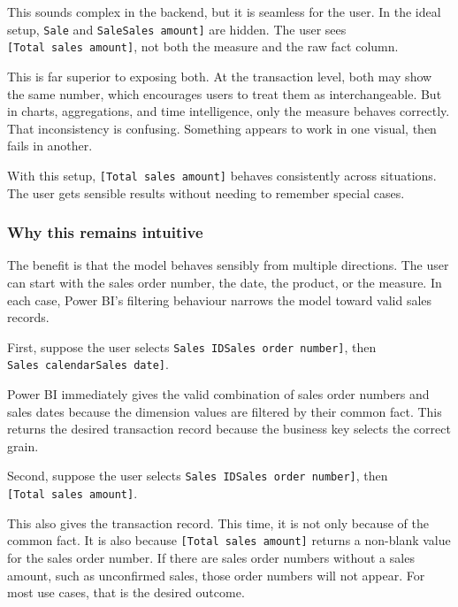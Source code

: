 \documentclass[10pt,openany,10pt]{book}
\begin{document}
This sounds complex in the backend, but it is seamless for the user. In
the ideal setup, \texttt{\textquotesingle{}Sale\textquotesingle{}} and
\texttt{\textquotesingle{}Sale\textquotesingle{}{[}Sales\ amount{]}} are
hidden. The user sees \texttt{{[}Total\ sales\ amount{]}}, not both the
measure and the raw fact column.

This is far superior to exposing both. At the transaction level, both
may show the same number, which encourages users to treat them as
interchangeable. But in charts, aggregations, and time intelligence,
only the measure behaves correctly. That inconsistency is confusing.
Something appears to work in one visual, then fails in another.

With this setup, \texttt{{[}Total\ sales\ amount{]}} behaves
consistently across situations. The user gets sensible results without
needing to remember special cases.

\subsubsection{Why this remains
intuitive}\label{why-this-remains-intuitive}

The benefit is that the model behaves sensibly from multiple directions.
The user can start with the sales order number, the date, the product,
or the measure. In each case, Power BI's filtering behaviour narrows the
model toward valid sales records.

First, suppose the user selects
\texttt{\textquotesingle{}Sales\ ID\textquotesingle{}{[}Sales\ order\ number{]}},
then
\texttt{\textquotesingle{}Sales\ calendar\textquotesingle{}{[}Sales\ date{]}}.

Power BI immediately gives the valid combination of sales order numbers
and sales dates because the dimension values are filtered by their
common fact. This returns the desired transaction record because the
business key selects the correct grain.

Second, suppose the user selects
\texttt{\textquotesingle{}Sales\ ID\textquotesingle{}{[}Sales\ order\ number{]}},
then \texttt{{[}Total\ sales\ amount{]}}.

This also gives the transaction record. This time, it is not only
because of the common fact. It is also because
\texttt{{[}Total\ sales\ amount{]}} returns a non-blank value for the
sales order number. If there are sales order numbers without a sales
amount, such as unconfirmed sales, those order numbers will not appear.
For most use cases, that is the desired outcome.
\end{document}
